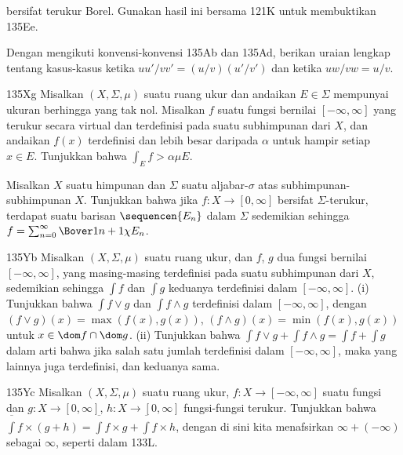 {


\noindent bersifat terukur Borel. Gunakan hasil ini bersama 121K untuk
membuktikan 135Ee.

 Dengan mengikuti konvensi-konvensi 135Ab dan 135Ad,
berikan uraian lengkap tentang kasus-kasus ketika
$uu'/vv'=(u/v)(u'/v')$ dan ketika $uw/vw=u/v$.

\spheader 135Xg Misalkan $(X,\Sigma,\mu)$ suatu ruang ukur dan andaikan
$E\in\Sigma$ mempunyai ukuran berhingga yang tak nol. Misalkan $f$ suatu
fungsi bernilai $[-\infty,\infty]$ yang terukur secara virtual dan
terdefinisi pada suatu subhimpunan dari $X$, dan andaikan $f(x)$ terdefinisi dan
lebih besar daripada $\alpha$ untuk hampir setiap $x\in E$. Tunjukkan bahwa
$\int_Ef>\alpha\mu E$.

Misalkan $X$ suatu himpunan dan $\Sigma$ suatu aljabar-$\sigma$ atas
subhimpunan-subhimpunan $X$. Tunjukkan bahwa jika $f:X\to[0,\infty]$
bersifat $\Sigma$-terukur, terdapat suatu barisan $\sequencen{E_n}$ dalam
$\Sigma$ sedemikian sehingga
$f=\sum_{n=0}^{\infty}\Bover1{n+1}\chi E_n$.

\spheader 135Yb Misalkan $(X,\Sigma,\mu)$ suatu ruang ukur, dan $f$, $g$
dua fungsi bernilai $[-\infty,\infty]$, yang masing-masing terdefinisi pada
suatu subhimpunan dari $X$, sedemikian sehingga $\int f$ dan $\int g$
keduanya terdefinisi dalam $[-\infty,\infty]$.
(i) Tunjukkan bahwa $\int f\vee g$ dan $\int f\wedge g$ terdefinisi dalam
$[-\infty,\infty]$, dengan $(f\vee g)(x)=\max(f(x),g(x))$,
$(f\wedge g)(x)=\min(f(x),g(x))$ untuk
$x\in\dom f\cap\dom g$. (ii) Tunjukkan bahwa
$\int f\vee g+\int f\wedge g=\int f+\int g$ dalam arti bahwa jika salah
satu jumlah terdefinisi dalam $[-\infty,\infty]$, maka yang lainnya juga
terdefinisi, dan keduanya sama.

\spheader 135Yc
Misalkan $(X,\Sigma,\mu)$ suatu ruang ukur,
$f:X\to[-\infty,\infty]$ suatu fungsi dan $g:X\to[0,\infty]$,
$h:X\to[0,\infty]$ fungsi-fungsi terukur. Tunjukkan bahwa
$\overline{\int}f\times(g+h)
=\overline{\int}f\times g+\overline{\int}f\times h$, dengan di sini kita
menafsirkan $\infty+(-\infty)$ sebagai $\infty$, seperti dalam 133L.
}%


